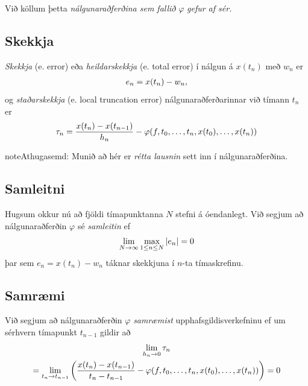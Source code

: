 \documentclass[letterpaper,10pt,icelandic]{sphinxmanual}
\begin{document}
Við köllum þetta \emph{nálgunaraðferðina sem fallið} \(\varphi\) \emph{gefur af
sér.}


\subsection{Skekkja}
\label{kafli06:id3}
\emph{Skekkja} (e. error) eða \emph{heildarskekkja} (e. total error) í nálgun á
\(x(t_n)\) með \(w_n\) er
\begin{gather}
\begin{split}e_n=x(t_n)-w_n,\end{split}\notag
\end{gather}
og \emph{staðarskekkja} (e. local truncation error) nálgunaraðferðarinnar við tímann \(t_n\)
er
\begin{gather}
\begin{split}\tau_n=\dfrac{x(t_n)-x(t_{n-1})}{h_n}
-\varphi(f,t_{0},\dots,t_n,x(t_{0}),\dots,x(t_{n}))\end{split}\notag
\end{gather}
\begin{notice}{note}{Athugasemd:}
Munið að hér er \emph{rétta lausnin} sett inn í nálgunaraðferðina.
\end{notice}


\subsection{Samleitni}
\label{kafli06:samleitni}\label{kafli06:index-18}
Hugsum okkur nú að fjöldi tímapunktanna \(N\) stefni á óendanlegt.
Við segjum að nálgunaraðferðin \(\varphi\) sé \emph{samleitin} ef
\begin{gather}
\begin{split}\lim_{N\to \infty} \max\limits_{1\leq n\leq N} |e_n|=0\end{split}\notag
\end{gather}
þar sem \(e_n=x(t_n)-w_n\) táknar skekkjuna í \(n\)-ta
tímaskrefinu.


\subsection{Samræmi}
\label{kafli06:samraemi}\label{kafli06:index-19}
Við segjum að nálgunaraðferðin \(\varphi\) \emph{samræmist}
upphafsgildisverkefninu ef um sérhvern tímapunkt \(t_{n-1}\) gildir
að
\begin{gather}
\begin{split}\begin{gathered}
\lim_{h_n\to 0}\tau_n\\
=\lim_{t_n\to t_{n-1}}\bigg(\dfrac{x(t_n)-x(t_{n-1})}{t_n-t_{n-1}}
-\varphi(f,t_{0},\dots,t_n,x(t_{0}),\dots,x(t_{n}))\bigg)
=0  \end{gathered}\end{split}\notag
\end{gather}
\end{document}
